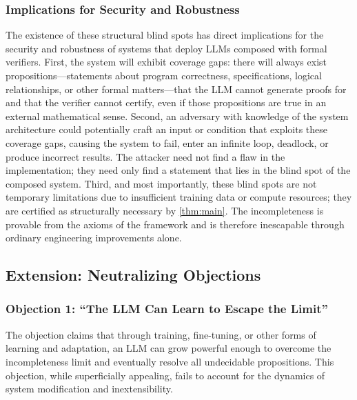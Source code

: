\documentclass[11pt]{article}
\begin{document}
\subsubsection{Implications for Security and Robustness}

The existence of these structural blind spots has direct implications for the security and robustness of systems that deploy LLMs composed with formal verifiers. First, the system will exhibit coverage gaps: there will always exist propositions—statements about program correctness, specifications, logical relationships, or other formal matters—that the LLM cannot generate proofs for and that the verifier cannot certify, even if those propositions are true in an external mathematical sense. Second, an adversary with knowledge of the system architecture could potentially craft an input or condition that exploits these coverage gaps, causing the system to fail, enter an infinite loop, deadlock, or produce incorrect results. The attacker need not find a flaw in the implementation; they need only find a statement that lies in the blind spot of the composed system. Third, and most importantly, these blind spots are not temporary limitations due to insufficient training data or compute resources; they are certified as structurally necessary by \ref{thm:main}. The incompleteness is provable from the axioms of the framework and is therefore inescapable through ordinary engineering improvements alone.

\subsection{Extension: Neutralizing Objections}
\label{subsec:objections}

\subsubsection{Objection 1: ``The LLM Can Learn to Escape the Limit''}

The objection claims that through training, fine-tuning, or other forms of learning and adaptation, an LLM can grow powerful enough to overcome the incompleteness limit and eventually resolve all undecidable propositions. This objection, while superficially appealing, fails to account for the dynamics of system modification and inextensibility.
\end{document}
